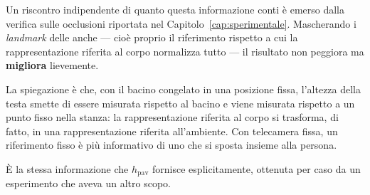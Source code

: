 Un riscontro indipendente di quanto questa informazione conti è emerso dalla
verifica sulle occlusioni riportata nel Capitolo~\ref{cap:sperimentale}.
Mascherando i \emph{landmark} delle anche — cioè proprio il riferimento rispetto
a cui la rappresentazione riferita al corpo normalizza tutto — il risultato non
peggiora ma \textbf{migliora} lievemente.

La spiegazione è che, con il bacino congelato in una posizione fissa, l'altezza
della testa smette di essere misurata rispetto al bacino e viene misurata
rispetto a un punto fisso nella stanza: la rappresentazione riferita al corpo si
trasforma, di fatto, in una rappresentazione riferita all'ambiente. Con
telecamera fissa, un riferimento fisso è più informativo di uno che si sposta
insieme alla persona.

È la stessa informazione che $h_{\text{pav}}$ fornisce esplicitamente, ottenuta
per caso da un esperimento che aveva un altro scopo.
